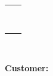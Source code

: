 \begin{tabular}{ll}
	\Studi    \hspace*{30pt} & \Studii   \\
	\Studiii  \hspace*{30pt} & \Studiv   \\
	\Studv    \hspace*{30pt} & \Studvi   \\
	\Studvii  \hspace*{30pt} & \Studviii \\
	\Studix   \hspace*{30pt} & \Studx    \\
	\Studxi   \hspace*{30pt} & \Studxii  \\
	\Studxiii \hspace*{30pt} & \Studxiv  \\
	\Studxv   \hspace*{30pt} & \Studxvi  \\
	\Studxvii  \\
	
\end{tabular}\\

\vspace{10pt}

\textbf{Customer:} \Customer